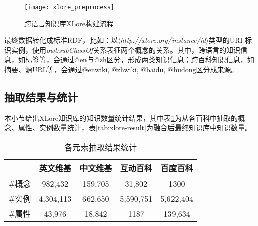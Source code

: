 \begin{figure}[ht]
  \centering
  \texttt{[image: xlore\_preprocess]}
  \caption{跨语言知识库XLore构建流程}
  \label{fig:xlore-preprocess}
\end{figure}

最终数据转化成标准RDF，比如：以$\langle$\emph{http://xlore.org/instance/id}$\rangle$类型的URI 标识实例，使用\textit{owl:subClassOf}关系表征两个概念的关系。其中，跨语言的知识信息，如标签等，会通过@en与@zh区分，形成两类知识信息；跨百科知识信息，如摘要、源URL等，会通过@enwiki, @zhwiki, @baidu, @hudong区分成来源。

\subsection{抽取结果与统计}
本小节给出XLore知识库的知识数量统计结果，其中表\ref{tab:extract-result}为从各百科中抽取的概念、属性、实例数量统计，表\ref{tab:xlore-result}为融合后最终知识库中知识数量。

\begin{table}[htb]
  \centering
  \caption{各元素抽取结果统计}
  \label{tab:extract-result}
    \begin{tabular}{ccccc}
      \toprule[1.5pt]
         & 英文维基    & 中文维基   & 互动百科    & 百度百科     \\ \midrule[1pt]
        \#概念 & 982,432   & 159,705  & 31,802    & 1300      \\
        \#实例 & 4,304,113 & 662,650  & 5,590,751 & 5,622,404 \\
        \#属性 & 43,976    & 18,842   & 1187      & 139,634   \\
      \bottomrule[1.5pt]
    \end{tabular}
\end{table}

